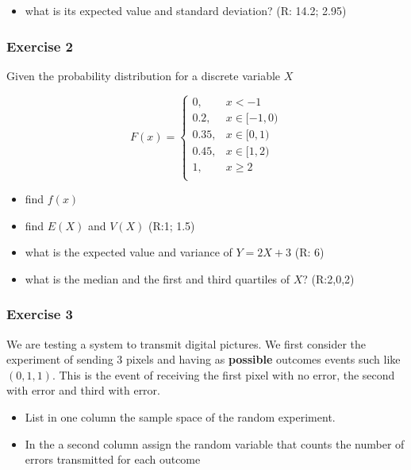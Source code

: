 \documentclass[
]{book}
\providecommand{\tightlist}{%
  \setlength{\itemsep}{0pt}\setlength{\parskip}{0pt}}
\begin{document}
\begin{itemize}
\tightlist
\item
  what is its expected value and standard deviation? (R: 14.2; 2.95)
\end{itemize}

\hypertarget{exercise-2-3}{%
\subsubsection{Exercise 2}\label{exercise-2-3}}

Given the probability distribution for a discrete variable \(X\)

\[
    F(x)= 
\begin{cases}
0, & x < -1 \\
0.2,& x \in [-1,0)\\
0.35,& x \in [0,1)\\
0.45,& x \in [1,2)\\
1,& x \geq 2\\
\end{cases}
\]

\begin{itemize}
\tightlist
\item
  find \(f(x)\)
\item
  find \(E(X)\) and \(V(X)\) (R:1; 1.5)
\item
  what is the expected value and variance of \(Y=2X+3\) (R: 6)
\item
  what is the median and the first and third quartiles of \(X\)? (R:2,0,2)
\end{itemize}

\hypertarget{exercise-3-1}{%
\subsubsection{Exercise 3}\label{exercise-3-1}}

We are testing a system to transmit digital pictures. We first consider the experiment of sending \(3\) pixels and having as \textbf{possible} outcomes events such like \((0,1,1)\). This is the event of receiving the first pixel with no error, the second with error and third with error.

\begin{itemize}
\item
  List in one column the sample space of the random experiment.
\item
  In the a second column assign the random variable that counts the number of errors transmitted for each outcome
\end{itemize}
\end{document}
